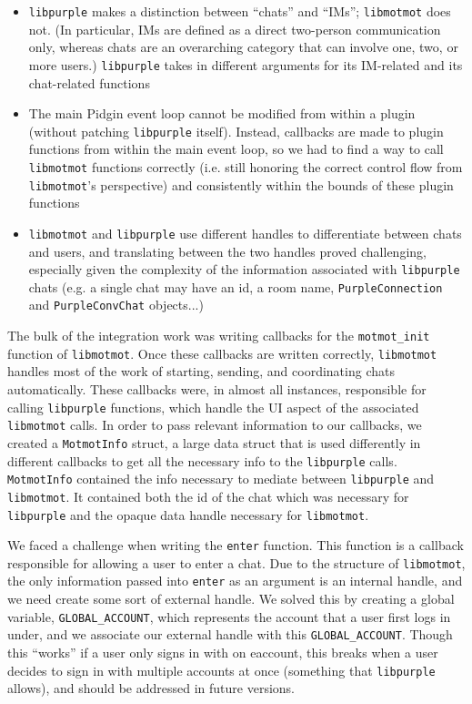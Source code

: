 \documentclass{sig-alternate}
\newcommand\libmotmot{\texttt{libmotmot}\xspace}
\newcommand\libpurple{\texttt{libpurple}\xspace}
\begin{document}
\begin{itemize}
\item \libpurple makes a distinction between ``chats'' and ``IMs''; \libmotmot
does not.  (In particular, IMs are defined as a direct two-person communication
only, whereas chats are an overarching category that can involve one, two, or
more users.) \libpurple takes in different arguments for its IM-related and its
chat-related functions

\item The main Pidgin event loop cannot be modified from within a plugin
(without patching \libpurple itself).  Instead, callbacks are made to plugin
functions from within the main event loop, so we had to find a way to call
\libmotmot functions correctly (i.e. still honoring the correct control flow
from \libmotmot's perspective) and consistently within the bounds of these
plugin functions

\item \libmotmot and \libpurple use different handles to differentiate between
chats and users, and translating between the two handles proved challenging,
especially given the complexity of the information associated with \libpurple
chats (e.g. a single chat may have an id, a room name, \verb`PurpleConnection`
and \verb`PurpleConvChat` objects...)

\end{itemize}

The bulk of the integration work was writing callbacks for the
\verb`motmot_init` function of \libmotmot.  Once these callbacks are written
correctly, \libmotmot handles most of the work of starting, sending, and
coordinating chats automatically.  These callbacks were, in almost all
instances, responsible for calling \libpurple functions, which handle the UI
aspect of the associated \libmotmot calls.  In order to pass relevant
information to our callbacks, we created a \verb`MotmotInfo` struct, a large
data struct that is used differently in different callbacks to get all the
necessary info to the \libpurple calls. \verb`MotmotInfo` contained the info
necessary to mediate between \libpurple and \libmotmot. It contained both the
id of the chat which was necessary for \libpurple and the opaque data handle
necessary for \libmotmot.

We faced a challenge when writing the \verb`enter` function.  This function is a
callback responsible for allowing a user to enter a chat.  Due to the structure
of \libmotmot, the only information passed into \verb`enter` as an argument is
an internal handle, and we need create some sort of external handle.  We solved
this by creating a global variable, \verb`GLOBAL_ACCOUNT`, which represents the
account that a user first logs in under, and we associate our external handle
with this \verb`GLOBAL_ACCOUNT`.  Though this ``works'' if a user only signs in
with on eaccount, this breaks when a user decides to sign in with multiple
accounts at once (something that \libpurple allows), and should be addressed in
future versions.
\end{document}
